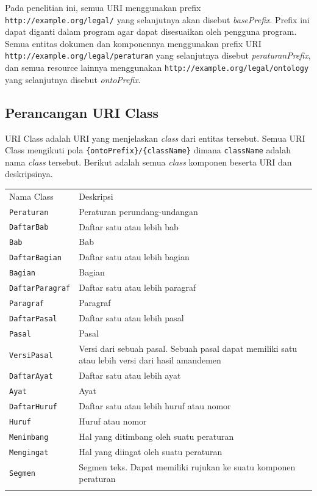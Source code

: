 Pada penelitian ini, semua URI menggunakan prefix
\texttt{http://example.org/legal/} yang selanjutnya akan disebut
\emph{basePrefix}. Prefix ini dapat diganti dalam program agar dapat
disesuaikan oleh pengguna program. Semua entitas dokumen dan komponennya
menggunakan prefix URI \texttt{http://example.org/legal/peraturan} yang
selanjutnya disebut \emph{peraturanPrefix}, dan semua resource lainnya
menggunakan \texttt{http://example.org/legal/ontology} yang selanjutnya
disebut \emph{ontoPrefix}.

\subsection{Perancangan URI Class}\label{perancangan-uri-class}

URI Class adalah URI yang menjelaskan \emph{class} dari entitas
tersebut. Semua URI Class mengikuti pola
\texttt{\{ontoPrefix\}/\{className\}} dimana \texttt{className} adalah
nama \emph{class} tersebut. Berikut adalah semua \emph{class} komponen
beserta URI dan deskripsinya.

\begin{longtable}[c]{@{}ll@{}}
\toprule\addlinespace
Nama Class & Deskripsi
\\\addlinespace
\midrule\endhead
\texttt{Peraturan} & Peraturan perundang-undangan
\\\addlinespace
\texttt{DaftarBab} & Daftar satu atau lebih bab
\\\addlinespace
\texttt{Bab} & Bab
\\\addlinespace
\texttt{DaftarBagian} & Daftar satu atau lebih bagian
\\\addlinespace
\texttt{Bagian} & Bagian
\\\addlinespace
\texttt{DaftarParagraf} & Daftar satu atau lebih paragraf
\\\addlinespace
\texttt{Paragraf} & Paragraf
\\\addlinespace
\texttt{DaftarPasal} & Daftar satu atau lebih pasal
\\\addlinespace
\texttt{Pasal} & Pasal
\\\addlinespace
\texttt{VersiPasal} & Versi dari sebuah pasal. Sebuah pasal dapat
memiliki satu atau lebih versi dari hasil amandemen
\\\addlinespace
\texttt{DaftarAyat} & Daftar satu atau lebih ayat
\\\addlinespace
\texttt{Ayat} & Ayat
\\\addlinespace
\texttt{DaftarHuruf} & Daftar satu atau lebih huruf atau nomor
\\\addlinespace
\texttt{Huruf} & Huruf atau nomor
\\\addlinespace
\texttt{Menimbang} & Hal yang ditimbang oleh suatu peraturan
\\\addlinespace
\texttt{Mengingat} & Hal yang diingat oleh suatu peraturan
\\\addlinespace
\texttt{Segmen} & Segmen teks. Dapat memiliki rujukan ke suatu komponen
peraturan
\\\addlinespace
\bottomrule
\end{longtable}

